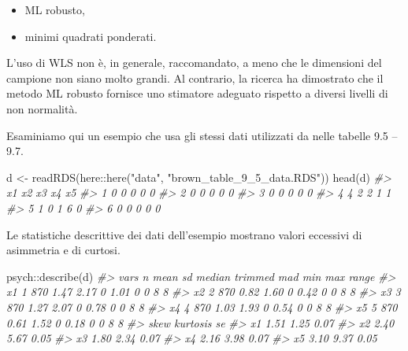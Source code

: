 \documentclass[
  11pt,
]{krantz}
\makeatletter
\newenvironment{Shaded}{\begin{snugshade}}{\end{snugshade}}
\newcommand{\CommentTok}[1]{\textcolor[rgb]{0.37,0.37,0.37}{\textit{#1}}}
\newcommand{\FunctionTok}[1]{\textcolor[rgb]{0,0,0}{#1}}
\newcommand{\NormalTok}[1]{#1}
\newcommand{\OtherTok}[1]{\textcolor[rgb]{0.37,0.37,0.37}{#1}}
\newcommand{\SpecialCharTok}[1]{\textcolor[rgb]{0,0,0}{#1}}
\newcommand{\StringTok}[1]{\textcolor[rgb]{0.5,0.5,0.5}{#1}}
\providecommand{\tightlist}{%
  \setlength{\itemsep}{0pt}\setlength{\parskip}{0pt}}
\newenvironment{kframe}{%
\medskip{}
\setlength{\fboxsep}{.8em}
 \def\at@end@of@kframe{}%
 \ifinner\ifhmode%
  \def\at@end@of@kframe{\end{minipage}}%
  \begin{minipage}{\columnwidth}%
 \fi\fi%
 \def\FrameCommand##1{\hskip\@totalleftmargin \hskip-\fboxsep
 \colorbox{shadecolor}{##1}\hskip-\fboxsep
     \hskip-\linewidth \hskip-\@totalleftmargin \hskip\columnwidth}%
 \MakeFramed {\advance\hsize-\width
   \@totalleftmargin\z@ \linewidth\hsize
   \@setminipage}}%
 {\par\unskip\endMakeFramed%
 \at@end@of@kframe}
\renewenvironment{Shaded}{\begin{kframe}}{\end{kframe}}
\theoremstyle{definition}
\theoremstyle{definition}
\theoremstyle{definition}
\theoremstyle{definition}
\theoremstyle{remark}
\makeatother
\begin{document}
\begin{itemize}
\tightlist
\item
  ML robusto,
\item
  minimi quadrati ponderati.
\end{itemize}

L'uso di WLS non è, in generale, raccomandato, a meno che le dimensioni del campione non siano molto grandi. Al contrario, la ricerca ha dimostrato che il metodo ML robusto fornisce uno stimatore adeguato rispetto a diversi livelli di non normalità.

Esaminiamo qui un esempio che usa gli stessi dati utilizzati da \citet{brown2015confirmatory} nelle tabelle 9.5 -- 9.7.

\begin{Shaded}
\begin{Highlighting}[]
\NormalTok{d }\OtherTok{\textless{}{-}} \FunctionTok{readRDS}\NormalTok{(here}\SpecialCharTok{::}\FunctionTok{here}\NormalTok{(}\StringTok{"data"}\NormalTok{, }\StringTok{"brown\_table\_9\_5\_data.RDS"}\NormalTok{))}
\FunctionTok{head}\NormalTok{(d)}
\CommentTok{\#\textgreater{}   x1 x2 x3 x4 x5}
\CommentTok{\#\textgreater{} 1  0  0  0  0  0}
\CommentTok{\#\textgreater{} 2  0  0  0  0  0}
\CommentTok{\#\textgreater{} 3  0  0  0  0  0}
\CommentTok{\#\textgreater{} 4  4  2  2  1  1}
\CommentTok{\#\textgreater{} 5  1  0  1  6  0}
\CommentTok{\#\textgreater{} 6  0  0  0  0  0}
\end{Highlighting}
\end{Shaded}

Le statistiche descrittive dei dati dell'esempio mostrano valori eccessivi di asimmetria e di curtosi.

\begin{Shaded}
\begin{Highlighting}[]
\NormalTok{psych}\SpecialCharTok{::}\FunctionTok{describe}\NormalTok{(d)}
\CommentTok{\#\textgreater{}    vars   n mean   sd median trimmed mad min max range}
\CommentTok{\#\textgreater{} x1    1 870 1.47 2.17      0    1.01   0   0   8     8}
\CommentTok{\#\textgreater{} x2    2 870 0.82 1.60      0    0.42   0   0   8     8}
\CommentTok{\#\textgreater{} x3    3 870 1.27 2.07      0    0.78   0   0   8     8}
\CommentTok{\#\textgreater{} x4    4 870 1.03 1.93      0    0.54   0   0   8     8}
\CommentTok{\#\textgreater{} x5    5 870 0.61 1.52      0    0.18   0   0   8     8}
\CommentTok{\#\textgreater{}    skew kurtosis   se}
\CommentTok{\#\textgreater{} x1 1.51     1.25 0.07}
\CommentTok{\#\textgreater{} x2 2.40     5.67 0.05}
\CommentTok{\#\textgreater{} x3 1.80     2.34 0.07}
\CommentTok{\#\textgreater{} x4 2.16     3.98 0.07}
\CommentTok{\#\textgreater{} x5 3.10     9.37 0.05}
\end{Highlighting}
\end{Shaded}
\end{document}
